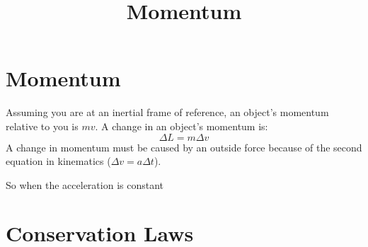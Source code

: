 \documentclass[]{article}
\title{Momentum}
\author{}
\begin{document}
\maketitle

\section{Momentum}
Assuming you are at an inertial frame of reference, an object's momentum relative to you is $mv$. A change in an object's momentum is:
$$\Delta L = m \Delta v$$
A change in momentum must be caused by an outside force because of the second equation in kinematics ($\Delta v = a\Delta t$).

So when the acceleration is constant
\section{Conservation Laws}
\end{document}
